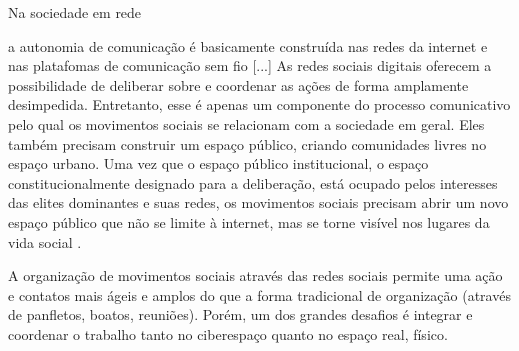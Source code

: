 Na sociedade em rede

\begin{citacao}
a autonomia de comunicação é basicamente construída nas redes da internet e nas platafomas de comunicação sem fio [...]  As redes sociais digitais oferecem a possibilidade de deliberar sobre e coordenar as ações de forma amplamente desimpedida. Entretanto, esse é apenas um componente do processo comunicativo pelo qual os movimentos sociais se relacionam com a sociedade em geral. Eles também precisam construir um espaço público, criando comunidades livres no espaço urbano. Uma vez que o espaço público institucional, o espaço constitucionalmente designado para a deliberação, está ocupado pelos interesses das elites dominantes e suas redes, os movimentos sociais precisam abrir um novo espaço público que não se limite à internet, mas se torne visível nos lugares da vida social \cite[p .18-19]{castells2013}.
\end{citacao}

A organização de movimentos sociais através das redes sociais permite uma ação e contatos mais ágeis e amplos do que a forma tradicional de organização (através de panfletos, boatos, reuniões). Porém, um dos grandes desafios é integrar e coordenar o trabalho tanto no ciberespaço quanto no espaço real, físico.



